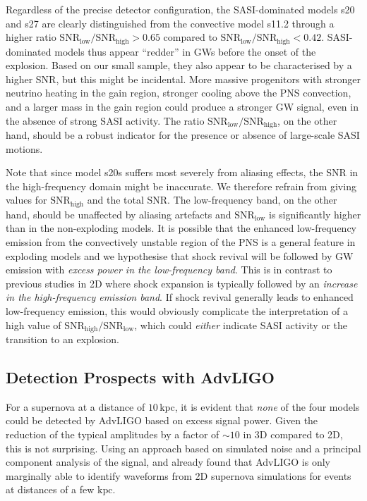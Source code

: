 Regardless of the precise detector configuration, the SASI-dominated
models s20 and s27 are clearly distinguished from the
convective model s11.2 through a higher ratio
$\mathrm{SNR}_\mathrm{low}/\mathrm{SNR}_\mathrm{high} >0.65$ compared
to $\mathrm{SNR}_\mathrm{low}/\mathrm{SNR}_\mathrm{high} <0.42$.
SASI-dominated models thus appear ``redder'' in GWs
before the onset of the explosion.
Based on our small sample, they also appear to be characterised by a higher SNR,
but this might be incidental. More massive progenitors with
stronger neutrino heating in the gain region, stronger cooling above
the PNS convection, and a larger mass in the gain region could 
produce a stronger GW signal, even in the absence of strong SASI activity. The ratio
$\mathrm{SNR}_\mathrm{low}/\mathrm{SNR}_\mathrm{high}$, on the other hand, should be a robust indicator for the presence or absence of
large-scale SASI motions.

Note that since model s20s suffers most severely from aliasing effects, the SNR
in the high-frequency domain might be inaccurate. We therefore refrain from giving values for $\mathrm{SNR}_{\mathrm{high}}$ and the total SNR.  The low-frequency band, on the other hand, should be unaffected by aliasing artefacts and $\mathrm{SNR}_\mathrm{low}$ is significantly
higher than in the non-exploding models. It is possible that the
enhanced low-frequency emission from the convectively unstable region
of the PNS is a general feature in exploding models and we
hypothesise that shock revival will be followed by GW emission with \emph{excess power in
  the low-frequency band}. This is in contrast to previous studies in 2D
\citep{murphy_09,mueller_13} where shock expansion is typically
followed by an \emph{increase in the high-frequency emission band}.
If shock revival generally leads to enhanced low-frequency emission,
this would obviously complicate the interpretation of
a high value of $\mathrm{SNR}_\mathrm{high}/\mathrm{SNR}_\mathrm{low}$,
which could \emph{either} indicate SASI activity or the transition
to an explosion.

\subsection{Detection Prospects with AdvLIGO}
For a supernova at a distance of $10 \, \mathrm{kpc}$, it is evident
that \emph{none} of the four models could be detected by AdvLIGO
based on excess signal power. Given the reduction of the typical
amplitudes by a factor of $\mathord{\sim} 10$ in 3D compared to 2D,
this is not surprising. Using an approach based on simulated noise and
a principal component analysis of the signal, \citet{logue_12}
and \citet{gossan_15} already
found that AdvLIGO is only marginally able to identify waveforms
from 2D supernova simulations for events at distances of a few
$\mathrm{kpc}$. 


